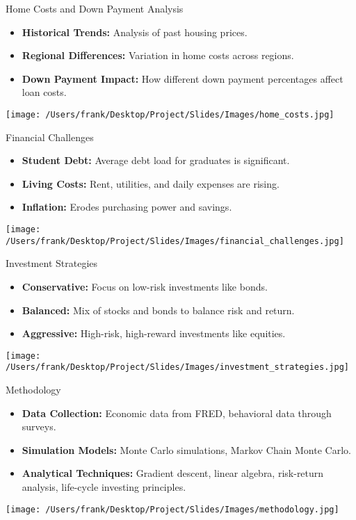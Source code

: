 \documentclass{beamer}
\begin{document}
\begin{frame}{Home Costs and Down Payment Analysis}
    \begin{itemize}
        \item \textbf{Historical Trends:} Analysis of past housing prices.
        \item \textbf{Regional Differences:} Variation in home costs across regions.
        \item \textbf{Down Payment Impact:} How different down payment percentages affect loan costs.
    \end{itemize}
    \centering
    \texttt{[image: /Users/frank/Desktop/Project/Slides/Images/home\_costs.jpg]}
\end{frame}

\begin{frame}{Financial Challenges}
    \begin{itemize}
        \item \textbf{Student Debt:} Average debt load for graduates is significant.
        \item \textbf{Living Costs:} Rent, utilities, and daily expenses are rising.
        \item \textbf{Inflation:} Erodes purchasing power and savings.
    \end{itemize}
    \centering
    \texttt{[image: /Users/frank/Desktop/Project/Slides/Images/financial\_challenges.jpg]}
\end{frame}

\begin{frame}{Investment Strategies}
    \begin{itemize}
        \item \textbf{Conservative:} Focus on low-risk investments like bonds.
        \item \textbf{Balanced:} Mix of stocks and bonds to balance risk and return.
        \item \textbf{Aggressive:} High-risk, high-reward investments like equities.
    \end{itemize}
    \centering
    \texttt{[image: /Users/frank/Desktop/Project/Slides/Images/investment\_strategies.jpg]}
\end{frame}

\begin{frame}{Methodology}
    \begin{itemize}
        \item \textbf{Data Collection:} Economic data from FRED, behavioral data through surveys.
        \item \textbf{Simulation Models:} Monte Carlo simulations, Markov Chain Monte Carlo.
        \item \textbf{Analytical Techniques:} Gradient descent, linear algebra, risk-return analysis, life-cycle investing principles.
    \end{itemize}
    \centering
    \texttt{[image: /Users/frank/Desktop/Project/Slides/Images/methodology.jpg]}
\end{frame}
\end{document}
